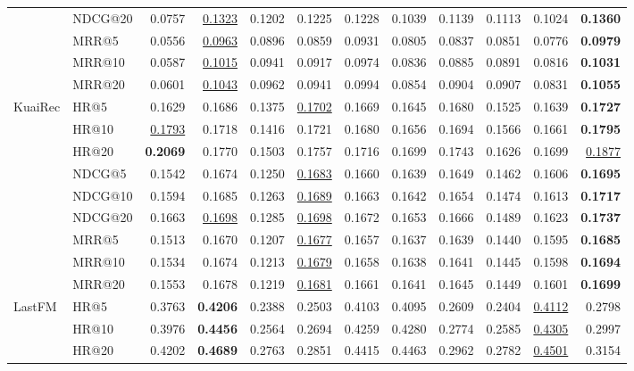 \begin{tabular}{llrrrrrrrrrr}
 & NDCG@20 & 0.0757 & \underline{0.1323} & 0.1202 & 0.1225 & 0.1228 & 0.1039 & 0.1139 & 0.1113 & 0.1024 & \textbf{0.1360} \\
 & MRR@5 & 0.0556 & \underline{0.0963} & 0.0896 & 0.0859 & 0.0931 & 0.0805 & 0.0837 & 0.0851 & 0.0776 & \textbf{0.0979} \\
 & MRR@10 & 0.0587 & \underline{0.1015} & 0.0941 & 0.0917 & 0.0974 & 0.0836 & 0.0885 & 0.0891 & 0.0816 & \textbf{0.1031} \\
 & MRR@20 & 0.0601 & \underline{0.1043} & 0.0962 & 0.0941 & 0.0994 & 0.0854 & 0.0904 & 0.0907 & 0.0831 & \textbf{0.1055} \\
\hline
KuaiRec & HR@5 & 0.1629 & 0.1686 & 0.1375 & \underline{0.1702} & 0.1669 & 0.1645 & 0.1680 & 0.1525 & 0.1639 & \textbf{0.1727} \\
 & HR@10 & \underline{0.1793} & 0.1718 & 0.1416 & 0.1721 & 0.1680 & 0.1656 & 0.1694 & 0.1566 & 0.1661 & \textbf{0.1795} \\
 & HR@20 & \textbf{0.2069} & 0.1770 & 0.1503 & 0.1757 & 0.1716 & 0.1699 & 0.1743 & 0.1626 & 0.1699 & \underline{0.1877} \\
 & NDCG@5 & 0.1542 & 0.1674 & 0.1250 & \underline{0.1683} & 0.1660 & 0.1639 & 0.1649 & 0.1462 & 0.1606 & \textbf{0.1695} \\
 & NDCG@10 & 0.1594 & 0.1685 & 0.1263 & \underline{0.1689} & 0.1663 & 0.1642 & 0.1654 & 0.1474 & 0.1613 & \textbf{0.1717} \\
 & NDCG@20 & 0.1663 & \underline{0.1698} & 0.1285 & \underline{0.1698} & 0.1672 & 0.1653 & 0.1666 & 0.1489 & 0.1623 & \textbf{0.1737} \\
 & MRR@5 & 0.1513 & 0.1670 & 0.1207 & \underline{0.1677} & 0.1657 & 0.1637 & 0.1639 & 0.1440 & 0.1595 & \textbf{0.1685} \\
 & MRR@10 & 0.1534 & 0.1674 & 0.1213 & \underline{0.1679} & 0.1658 & 0.1638 & 0.1641 & 0.1445 & 0.1598 & \textbf{0.1694} \\
 & MRR@20 & 0.1553 & 0.1678 & 0.1219 & \underline{0.1681} & 0.1661 & 0.1641 & 0.1645 & 0.1449 & 0.1601 & \textbf{0.1699} \\
\hline
LastFM & HR@5 & 0.3763 & \textbf{0.4206} & 0.2388 & 0.2503 & 0.4103 & 0.4095 & 0.2609 & 0.2404 & \underline{0.4112} & 0.2798 \\
 & HR@10 & 0.3976 & \textbf{0.4456} & 0.2564 & 0.2694 & 0.4259 & 0.4280 & 0.2774 & 0.2585 & \underline{0.4305} & 0.2997 \\
 & HR@20 & 0.4202 & \textbf{0.4689} & 0.2763 & 0.2851 & 0.4415 & 0.4463 & 0.2962 & 0.2782 & \underline{0.4501} & 0.3154 \\

\end{tabular}

